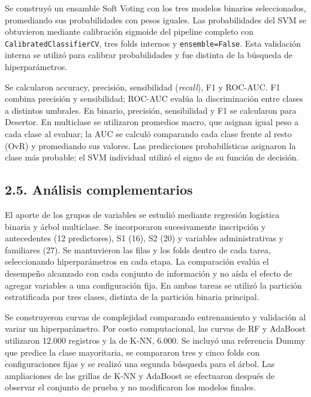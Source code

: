 \documentclass[10pt,a4paper]{article}
\begin{document}
Se construyó un ensamble Soft Voting con los tres modelos binarios seleccionados, promediando sus probabilidades con pesos iguales. Las probabilidades
del SVM se obtuvieron mediante calibración sigmoide del pipeline completo con \texttt{CalibratedClassifierCV}, tres folds internos y
\texttt{ensemble=False}. Esta validación interna se utilizó para calibrar probabilidades y fue distinta de la búsqueda de hiperparámetros.

Se calcularon accuracy, precisión, sensibilidad (\emph{recall}), F1 y ROC-AUC. F1 combina precisión y sensibilidad; ROC-AUC evalúa la discriminación
entre clases a distintos umbrales. En binario, precisión, sensibilidad y F1 se calcularon para Desertor. En multiclase se utilizaron promedios macro,
que asignan igual peso a cada clase al evaluar; la AUC se calculó comparando cada clase frente al resto (OvR) y promediando sus valores. Las
predicciones probabilísticas asignaron la clase más probable; el SVM individual utilizó el signo de su función de decisión.

\hypertarget{anuxe1lisis-complementarios}{%
\subsection{2.5. Análisis complementarios}\label{anuxe1lisis-complementarios}}

El aporte de los grupos de variables se estudió mediante regresión logística binaria y árbol multiclase. Se incorporaron sucesivamente inscripción y
antecedentes (12 predictores), S1 (16), S2 (20) y variables administrativas y familiares (27). Se mantuvieron las filas y los folds dentro de cada
tarea, seleccionando hiperparámetros en cada etapa. La comparación evalúa el desempeño alcanzado con cada conjunto de información y no aísla el efecto
de agregar variables a una configuración fija. En ambas tareas se utilizó la partición estratificada por tres clases, distinta de la partición binaria
principal.

Se construyeron curvas de complejidad comparando entrenamiento y validación al variar un hiperparámetro. Por costo computacional, las curvas de RF y
AdaBoost utilizaron 12.000 registros y la de K-NN, 6.000. Se incluyó una referencia Dummy que predice la clase mayoritaria, se compararon tres y cinco
folds con configuraciones fijas y se realizó una segunda búsqueda para el árbol. Las ampliaciones de las grillas de K-NN y AdaBoost se efectuaron
después de observar el conjunto de prueba y no modificaron los modelos finales.
\end{document}
